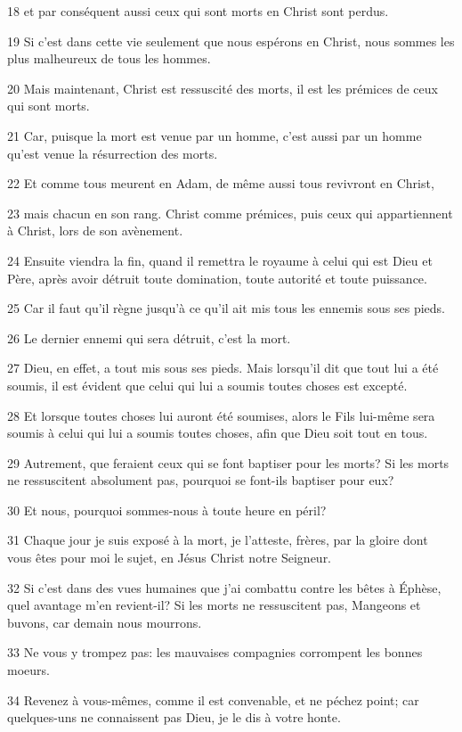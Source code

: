 \par 18 et par conséquent aussi ceux qui sont morts en Christ sont perdus.
\par 19 Si c'est dans cette vie seulement que nous espérons en Christ, nous sommes les plus malheureux de tous les hommes.
\par 20 Mais maintenant, Christ est ressuscité des morts, il est les prémices de ceux qui sont morts.
\par 21 Car, puisque la mort est venue par un homme, c'est aussi par un homme qu'est venue la résurrection des morts.
\par 22 Et comme tous meurent en Adam, de même aussi tous revivront en Christ,
\par 23 mais chacun en son rang. Christ comme prémices, puis ceux qui appartiennent à Christ, lors de son avènement.
\par 24 Ensuite viendra la fin, quand il remettra le royaume à celui qui est Dieu et Père, après avoir détruit toute domination, toute autorité et toute puissance.
\par 25 Car il faut qu'il règne jusqu'à ce qu'il ait mis tous les ennemis sous ses pieds.
\par 26 Le dernier ennemi qui sera détruit, c'est la mort.
\par 27 Dieu, en effet, a tout mis sous ses pieds. Mais lorsqu'il dit que tout lui a été soumis, il est évident que celui qui lui a soumis toutes choses est excepté.
\par 28 Et lorsque toutes choses lui auront été soumises, alors le Fils lui-même sera soumis à celui qui lui a soumis toutes choses, afin que Dieu soit tout en tous.
\par 29 Autrement, que feraient ceux qui se font baptiser pour les morts? Si les morts ne ressuscitent absolument pas, pourquoi se font-ils baptiser pour eux?
\par 30 Et nous, pourquoi sommes-nous à toute heure en péril?
\par 31 Chaque jour je suis exposé à la mort, je l'atteste, frères, par la gloire dont vous êtes pour moi le sujet, en Jésus Christ notre Seigneur.
\par 32 Si c'est dans des vues humaines que j'ai combattu contre les bêtes à Éphèse, quel avantage m'en revient-il? Si les morts ne ressuscitent pas, Mangeons et buvons, car demain nous mourrons.
\par 33 Ne vous y trompez pas: les mauvaises compagnies corrompent les bonnes moeurs.
\par 34 Revenez à vous-mêmes, comme il est convenable, et ne péchez point; car quelques-uns ne connaissent pas Dieu, je le dis à votre honte.
